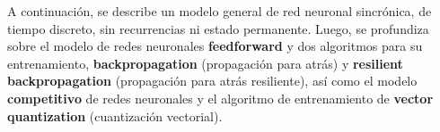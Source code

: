 A continuación, se describe un modelo general de red neuronal sincrónica, de tiempo discreto, sin recurrencias ni estado permanente. Luego, se profundiza sobre el modelo de redes neuronales \textbf{feedforward} y dos algoritmos para su entrenamiento, \textbf{backpropagation} (propagación para atrás) y \textbf{resilient backpropagation} (propagación para atrás resiliente), así como el modelo \textbf{competitivo} de redes neuronales y el algoritmo de entrenamiento de \textbf{vector quantization} (cuantización vectorial).


